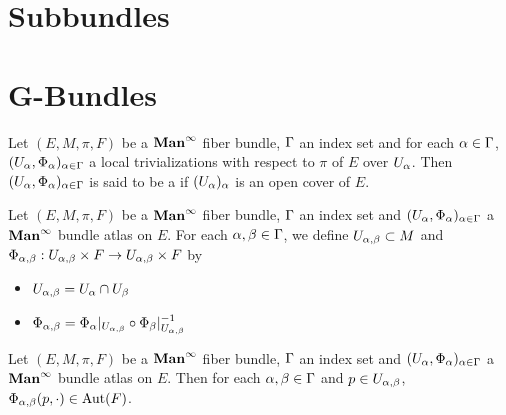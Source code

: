 \documentclass{book}
\begin{document}
	
	
	
	
	
	
	
	
	
	
	
	
	
	
	
	
	
	
	
	
	
	\newpage
	\section{Subbundles}
	
	\begin{defn}
		
	\end{defn}
	
	
	
	
	\newpage
	\section{G-Bundles}
	
	\begin{defn}
		Let $(E, M, \pi, F)$ be a $\operatorname*{\text{\textbf{Man}}^{\infty}}$ fiber bundle, $\Gamma$ an index set and for each $\alpha \in \Gamma$, $(U_{\alpha}, \Phi_{\alpha})_{\alpha \in \Gamma}$ a local trivializations with respect to $\pi$ of $E$ over $U_{\alpha}$. Then $(U_{\alpha}, \Phi_{\alpha})_{\alpha \in \Gamma}$ is said to be a  if $(U_{\alpha})_{\alpha}$ is an open cover of $E$. 
	\end{defn}

	\begin{defn}
		Let $(E, M, \pi, F)$ be a $\operatorname*{\text{\textbf{Man}}^{\infty}}$ fiber bundle, $\Gamma$ an index set and $(U_{\alpha}, \Phi_{\alpha})_{\alpha \in \Gamma}$ a $\operatorname*{\text{\textbf{Man}}^{\infty}}$ bundle atlas on $E$. For each $\alpha,\beta \in \Gamma$, we define $U_{\alpha,\beta} \subset M$ and $\Phi_{\alpha,\beta}: U_{\alpha,\beta} \times F \rightarrow U_{\alpha,\beta} \times F$ by 
		\begin{itemize}
			\item $U_{\alpha, \beta} = U_{\alpha} \cap U_{\beta}$
			\item $\Phi_{\alpha, \beta} = \Phi_{\alpha}|_{U_{\alpha, \beta}} \circ \Phi_{\beta}|_{U_{\alpha, \beta}}^{-1}$
		\end{itemize}
	\end{defn}
	
	\begin{ex}
		Let $(E, M, \pi, F)$ be a $\operatorname*{\text{\textbf{Man}}^{\infty}}$ fiber bundle, $\Gamma$ an index set and $(U_{\alpha}, \Phi_{\alpha})_{\alpha \in \Gamma}$ a $\operatorname*{\text{\textbf{Man}}^{\infty}}$ bundle atlas on $E$. Then for each $\alpha, \beta \in \Gamma$ and $p \in U_{\alpha, \beta}$, $\Phi_{\alpha,\beta}(p, \cdot) \in \operatorname{Aut}(F)$.
	\end{ex}
\end{document}
